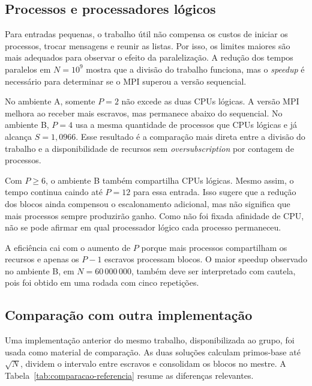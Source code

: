 \documentclass[12pt,a4paper]{article}
\begin{document}
\subsection{Processos e processadores lógicos}

Para entradas pequenas, o trabalho útil não compensa os custos de iniciar os
processos, trocar mensagens e reunir as listas. Por isso, os limites maiores
são mais adequados para observar o efeito da paralelização. A redução dos
tempos paralelos em $N=10^9$ mostra que a divisão do trabalho funciona, mas o
\textit{speedup} é necessário para determinar se o MPI superou a versão
sequencial.

No ambiente A, somente $P=2$ não excede as duas CPUs lógicas. A versão MPI
melhora ao receber mais escravos, mas permanece abaixo do sequencial. No
ambiente B, $P=4$ usa a mesma quantidade de processos que CPUs lógicas e já
alcança $S=1{,}0966$. Esse resultado é a comparação mais direta entre a
divisão do trabalho e a disponibilidade de recursos sem
\textit{oversubscription} por contagem de processos.

Com $P\geq6$, o ambiente B também compartilha CPUs lógicas. Mesmo assim, o
tempo continua caindo até $P=12$ para essa entrada. Isso sugere que a redução
dos blocos ainda compensou o escalonamento adicional, mas não significa que
mais processos sempre produzirão ganho. Como não foi fixada afinidade de CPU,
não se pode afirmar em qual processador lógico cada processo permaneceu.

A eficiência cai com o aumento de $P$ porque mais processos compartilham os
recursos e apenas os $P-1$ escravos processam blocos. O maior speedup observado
no ambiente B, em $N=60\,000\,000$, também deve ser interpretado com cautela,
pois foi obtido em uma rodada com cinco repetições.

\subsection{Comparação com outra implementação}

Uma implementação anterior do mesmo trabalho, disponibilizada ao grupo, foi
usada como material de comparação. As duas soluções calculam primos-base até
$\sqrt{N}$, dividem o intervalo entre escravos e consolidam os blocos no
mestre. A Tabela~\ref{tab:comparacao-referencia} resume as diferenças
relevantes.
\end{document}
